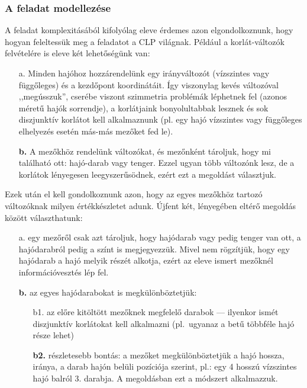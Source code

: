 \subsubsection{A feladat modellezése}

A feladat komplexitásából kifolyólag eleve érdemes azon elgondolkoznunk, hogy hogyan
feleltessük meg a feladatot a CLP világnak. Például a korlát-változók felvételére
is eleve két lehetőségünk van:

\begin{itemize}
\item[a.] Minden hajóhoz hozzárendelünk egy irányváltozót (vízszintes vagy
függőleges) és a kezdőpont koordinátáit. Így viszonylag kevés változóval
,,megússzuk'', cserébe viszont szimmetria problémák léphetnek fel
(azonos méretű hajók sorrendje), a korlátjaink bonyolultabbak lesznek és
sok diszjunktív korlátot kell alkalmaznunk (pl. egy hajó vízszintes vagy
függőleges elhelyezés esetén más-más mezőket fed le).
\item[{\bf b.}] A mezőkhöz rendelünk változókat, és mezőnként tároljuk, hogy mi
található ott: hajó-darab vagy tenger. Ezzel ugyan több változónk lesz,
de a korlátok lényegesen leegyszerűsödnek, ezért ezt a megoldást választjuk.
\end{itemize}

Ezek után el kell gondolkoznunk azon, hogy az egyes mezőkhöz tartozó változóknak
milyen értékkészletet adunk. Újfent két, lényegében eltérő megoldás között
választhatunk:

\begin{itemize}
\item[a.] egy mezőről csak azt tároljuk, hogy hajódarab vagy pedig tenger van ott,
a hajódarabról pedig a színt is megjegyezzük. Mivel nem rögzítjük, hogy egy hajódarab
a hajó melyik részét alkotja, ezért az eleve ismert mezőknél információvesztés lép fel.
\item[{\bf b.}] az egyes hajódarabokat is megkülönböztetjük:
\begin{itemize}
\item[b1.] az előre kitöltött mezőknek megfelelő darabok  --- ilyenkor
ismét diszjunktív korlátokat kell alkalmazni (pl.\ ugyanaz a betű többféle hajó része
lehet)
\item[{\bf b2.}] részletesebb bontás: a mezőket megkülönböztetjük a hajó hossza, iránya, a
darab hajón belüli pozíciója szerint, pl.: egy 4 hosszú vízszintes hajó balról
3. darabja. A megoldásban ezt a módszert alkalmazzuk.
\end{itemize}
\end{itemize}

